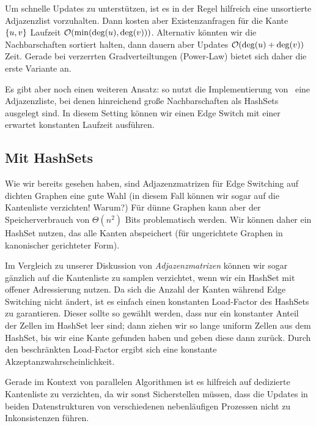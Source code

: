 Um schnelle Updates zu unterstützen, ist es in der Regel hilfreich eine unsortierte Adjazenzlist vorzuhalten.
Dann kosten aber Existenzanfragen für die Kante $\left\{u,v\right\}$ Laufzeit $\mathcal{O}\!\left(\min(\deg(u), \deg(v))\right)$.
Alternativ könnten wir die Nachbarschaften sortiert halten, dann dauern aber Updates $\mathcal{O}\!\left(\deg(u) + \deg(v)\right)$ Zeit.
Gerade bei verzerrten Gradverteiltungen (\zB Power-Law) bietet sich daher die erste Variante an.

Es gibt aber noch einen weiteren Ansatz: so nutzt die Implementierung von~\cite{DBLP:journals/compnet/VigerL16} eine Adjazenzliste, bei denen hinreichend große Nachbarschaften als HashSets ausgelegt sind.
In diesem Setting können wir einen Edge Switch mit einer erwartet konstanten Laufzeit ausführen.

\subsection{Mit HashSets}
Wie wir bereits gesehen haben, sind Adjazenzmatrizen für Edge Switching auf dichten Graphen eine gute Wahl (in diesem Fall können wir sogar auf die Kantenliste verzichten! Warum?)
Für dünne Graphen kann aber der Speicherverbrauch von $\Theta(n^2)$ Bits problematisch werden.
Wir können daher ein HashSet nutzen, das alle Kanten abspeichert (für ungerichtete Graphen in kanonischer gerichteter Form).

Im Vergleich zu unserer Diskussion von \emph{Adjazenzmatrizen} können wir sogar gänzlich auf die Kantenliste zu samplen verzichtet, wenn wir ein HashSet mit offener Adressierung nutzen.
Da sich die Anzahl der Kanten während Edge Switching nicht ändert, ist es einfach einen konstanten Load-Factor des HashSets zu garantieren.
Dieser sollte so gewählt werden, dass nur ein konstanter Anteil der Zellen im HashSet leer sind;
dann ziehen wir so lange uniform Zellen aus dem HashSet, bis wir eine Kante gefunden haben und geben diese dann zurück.
Durch den beschränkten Load-Factor ergibt sich eine konstante Akzeptanzwahrscheinlichkeit.

Gerade im Kontext von parallelen Algorithmen ist es hilfreich auf dedizierte Kantenliste zu verzichten, da wir sonst Sicherstellen müssen, dass die Updates in beiden Datenstrukturen von verschiedenen nebenläufigen Prozessen nicht zu Inkonsistenzen führen.



